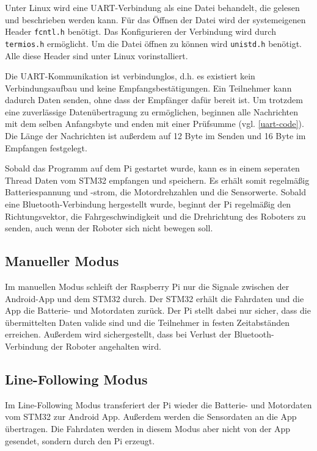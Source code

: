 \documentclass[12pt, a4paper]{report}
\begin{document}
Unter Linux wird eine UART-Verbindung als eine Datei behandelt, die gelesen und beschrieben werden kann. Für das Öffnen der Datei wird der systemeigenen Header \texttt{fcntl.h} benötigt. Das Konfigurieren der Verbindung wird durch \texttt{termios.h} ermöglicht. Um die Datei öffnen zu können wird \texttt{unistd.h} benötigt. Alle diese Header sind unter Linux vorinstalliert.

Die UART-Kommunikation ist verbindunglos, d.h. es existiert kein Verbindungsaufbau und keine Empfangsbestätigungen. Ein Teilnehmer kann dadurch Daten senden, ohne dass der Empfänger dafür bereit ist. Um trotzdem eine zuverlässige Datenübertragung zu ermöglichen, beginnen alle Nachrichten mit dem selben Anfangsbyte und enden mit einer Prüfsumme (vgl. \ref{uart-code}). Die Länge der Nachrichten ist außerdem auf 12 Byte im Senden und 16 Byte im Empfangen festgelegt.

Sobald das Programm auf dem Pi gestartet wurde, kann es in einem seperaten Thread Daten vom STM32 empfangen und speichern. Es erhält somit regelmäßig Batteriespannung und -strom, die Motordrehzahlen und die Sensorwerte. Sobald eine Bluetooth-Verbindung hergestellt wurde, beginnt der Pi regelmäßig den Richtungsvektor, die Fahrgeschwindigkeit und die Drehrichtung des Roboters zu senden, auch wenn der Roboter sich nicht bewegen soll.


\newpage

\subsection{Manueller Modus}

Im manuellen Modus schleift der Raspberry Pi nur die Signale zwischen der Android-App und dem STM32 durch. Der STM32 erhält die Fahrdaten und die App die Batterie- und Motordaten zurück. Der Pi stellt dabei nur sicher, dass die übermittelten Daten valide sind und die Teilnehmer in festen Zeitabständen erreichen. Außerdem wird sichergestellt, dass bei Verlust der Bluetooth-Verbindung der Roboter angehalten wird.


\subsection{Line-Following Modus}

Im Line-Following Modus transferiert der Pi wieder die Batterie- und Motordaten vom STM32 zur Android App. Außerdem werden die Sensordaten an die App übertragen. Die Fahrdaten werden in diesem Modus aber nicht von der App gesendet, sondern durch den Pi erzeugt.
\end{document}
